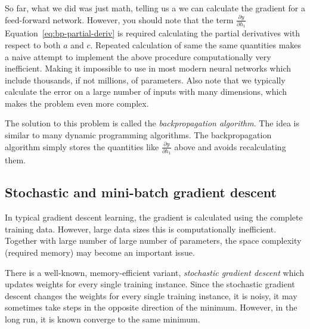 So far, what we did was just math,
telling us a we can calculate the gradient for a feed-forward network.
However, you should note that
the term $\frac{\partial y}{\partial h_{1}}$
Equation~\ref{eq:bp-partial-deriv}
is required calculating the partial derivatives
with respect to both $a$ and $c$.
Repeated calculation of same the same quantities
makes a naive attempt to implement
the above procedure computationally very inefficient.
Making it impossible to use in most
modern neural networks which include thousands, if not millions, of parameters.
Also note that we typically calculate the error on a large
number of inputs with many dimensions,
which makes the problem even more complex.

The solution to this problem is called the \emph{backpropagation algorithm}.
The idea is similar to many dynamic programming algorithms.
The backpropagation algorithm simply stores the quantities
like $\frac{\partial y}{\partial h_{1}}$ above 
and avoids recalculating them.

\subsection{Stochastic and mini-batch gradient descent}

In typical gradient descent learning,
the gradient is calculated using the complete training data.
However, large data sizes this is computationally inefficient.
Together with large number of large number of parameters,
the space complexity (required memory) may become an important issue.

There is a well-known, memory-efficient variant,
\emph{stochastic gradient descent}
which updates weights for every single training instance.
Since the stochastic gradient descent changes the weights for every single
training instance, it is noisy,
it may sometimes take steps in the opposite direction of the minimum.
However, in the long run, it is known converge to the same minimum.

